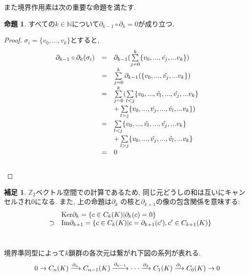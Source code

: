 \documentclass[a4paper]{jsarticle}
\theoremstyle{definition}
\newtheorem{prop}[dfn]{命題}
\newtheorem{hsk}[dfn]{補足}
\newcommand{\Ker}{{\mathrm{Ker}}}
\newcommand{\Image}{{\mathrm{Im}}}
\begin{document}
  また境界作用素は次の重要な命題を満たす. 
\begin{prop}
    すべての$k\in\mathbb{N}$について$\partial_{k-1}\circ \partial_k=0$が成り立つ. 
\end{prop}
\begin{proof}
    $\sigma_i=\{v_0,...,v_k\}$とすると, 
\begin{equation}
    \begin{array}{lll}
       \partial_{k-1}\circ \partial_k(\sigma_i)  & = & \partial_{k-1}(\sum\limits_{j=0}^{k} \{v_0,...,\hat{v_j},...v_k\})\\
         & = & \sum\limits_{j=0}^{k}  \partial_{k-1}(\{v_0,...,\hat{v_j},...v_k\})\\
         & = & \sum\limits_{j=0}^{k}  (\sum\limits_{l<j}^{} \{v_0,...,\hat{v_l},...,\hat{v_j},...v_k\}\\
         & & +\sum\limits_{l>j}^{} \{v_0,...,\hat{v_j},...,\hat{v_l},...v_k\})\\
         & = & \sum\limits_{l<j}^{} \{v_0,...,\hat{v_l},...,\hat{v_j},...v_k\}\\
         & & +\sum\limits_{l>j}^{} \{v_0,...,\hat{v_j},...,\hat{v_l},...v_k\}\\
         & = & 0 \notag
    \end{array}
\end{equation} \\
\end{proof}
\begin{hsk}
    $\mathbb{Z}_2$ベクトル空間での計算であるため, 同じ元どうしの和は互いにキャンセルされ0になる. また, 上の命題は$\partial_k$ の核と$\partial_{k+1}$の像の包含関係を意味する:
\begin{equation}
    \begin{array}{lll}
        &  & \Ker \partial_k =\{c \in C_k(K)| \partial_k(c)=0\}\\
         & \supset & \Image \partial_{k+1} = \{c \in C_k(K)| c= \partial_{k+1}(c'), c'\in C_{k+1}(K)\}\notag
    \end{array}
\end{equation}\\
\end{hsk}
境界準同型によって$k$鎖群の各次元は繋がれ下図の系列が表れる. 
\begin{equation}
    0\rightarrow C_n(K)\xrightarrow[]{\partial_n} C_{n-1}(K)\xrightarrow[]{\partial_{n-1}}\cdot\cdot\cdot\xrightarrow[]{\partial_2} C_1(K)\xrightarrow[]{\partial_1} C_0(K)\rightarrow 0\notag
\end{equation}
\end{document}
